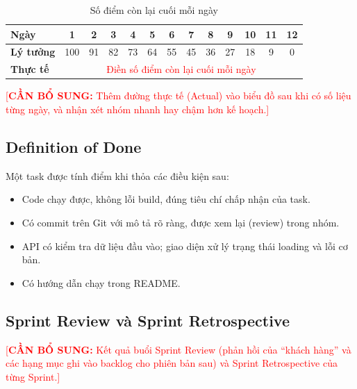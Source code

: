 \documentclass[a4paper]{article}
\newcommand{\chen}[1]{\textcolor{red}{[\textbf{CẦN BỔ SUNG:} #1]}}
\begin{document}
\begin{table}[h!]
\centering
\footnotesize
\begin{tabular}{|l|c|c|c|c|c|c|c|c|c|c|c|c|}
\hline
\textbf{Ngày} & 1 & 2 & 3 & 4 & 5 & 6 & 7 & 8 & 9 & 10 & 11 & 12 \\ \hline
\textbf{Lý tưởng} & 100 & 91 & 82 & 73 & 64 & 55 & 45 & 36 & 27 & 18 & 9 & 0 \\ \hline
\textbf{Thực tế} & \multicolumn{12}{c|}{\textcolor{red}{Điền số điểm còn lại cuối mỗi ngày}} \\ \hline
\end{tabular}
\caption{Số điểm còn lại cuối mỗi ngày}
\end{table}

\chen{Thêm đường thực tế (Actual) vào biểu đồ sau khi có số liệu từng ngày, và nhận xét nhóm nhanh hay chậm hơn kế hoạch.}

\subsection{Definition of Done}
Một task được tính điểm khi thỏa các điều kiện sau:
\begin{itemize}
	\item Code chạy được, không lỗi build, đúng tiêu chí chấp nhận của task.
	\item Có commit trên Git với mô tả rõ ràng, được xem lại (review) trong nhóm.
	\item API có kiểm tra dữ liệu đầu vào; giao diện xử lý trạng thái loading và lỗi cơ bản.
	\item Có hướng dẫn chạy trong README.
\end{itemize}

\subsection{Sprint Review và Sprint Retrospective}
\chen{Kết quả buổi Sprint Review (phản hồi của ``khách hàng'' và các hạng mục ghi vào backlog cho phiên bản sau) và Sprint Retrospective của từng Sprint.}
\end{document}
